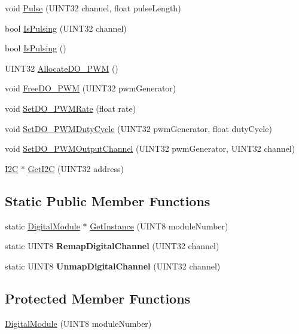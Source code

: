 \begin{DoxyCompactItemize}
\item 
void \hyperlink{classDigitalModule_a3651d475c592ed0330cfb08d1de00bc8}{Pulse} (UINT32 channel, float pulseLength)
\item 
bool \hyperlink{classDigitalModule_affabf884db92ab9290189cff53003480}{IsPulsing} (UINT32 channel)
\item 
bool \hyperlink{classDigitalModule_a16bfc42defa1aab106cfbc6fd722b28f}{IsPulsing} ()
\item 
UINT32 \hyperlink{classDigitalModule_a7289f380a40fa407f9b31f81fb8ed0f3}{AllocateDO\_\-PWM} ()
\item 
void \hyperlink{classDigitalModule_a7e388e508e7de68a06868a127670a9da}{FreeDO\_\-PWM} (UINT32 pwmGenerator)
\item 
void \hyperlink{classDigitalModule_a3419b44d9ab72e95df6c0917e5e7db72}{SetDO\_\-PWMRate} (float rate)
\item 
void \hyperlink{classDigitalModule_a74d6d4ae310213e91891de4b8940b917}{SetDO\_\-PWMDutyCycle} (UINT32 pwmGenerator, float dutyCycle)
\item 
void \hyperlink{classDigitalModule_ac9b8da9267956e905c9083dcfb6b4a8f}{SetDO\_\-PWMOutputChannel} (UINT32 pwmGenerator, UINT32 channel)
\item 
\hyperlink{classI2C}{I2C} $\ast$ \hyperlink{classDigitalModule_ae776c8449cf18b7f90fec0126b3e8373}{GetI2C} (UINT32 address)
\end{DoxyCompactItemize}
\subsection*{Static Public Member Functions}
\begin{DoxyCompactItemize}
\item 
static \hyperlink{classDigitalModule}{DigitalModule} $\ast$ \hyperlink{classDigitalModule_ad6384445078c80a3b77ef4d2e840f930}{GetInstance} (UINT8 moduleNumber)
\item 
\hypertarget{classDigitalModule_a3960491ecc2a2adac1f53d87e9cbcbdf}{
static UINT8 {\bfseries RemapDigitalChannel} (UINT32 channel)}
\label{classDigitalModule_a3960491ecc2a2adac1f53d87e9cbcbdf}

\item 
\hypertarget{classDigitalModule_a273fcd2893fbb23fe9747a8468ef3cff}{
static UINT8 {\bfseries UnmapDigitalChannel} (UINT32 channel)}
\label{classDigitalModule_a273fcd2893fbb23fe9747a8468ef3cff}

\end{DoxyCompactItemize}
\subsection*{Protected Member Functions}
\begin{DoxyCompactItemize}
\item 
\hyperlink{classDigitalModule_ab0794c372d0465bbf5c409c9e46dd0de}{DigitalModule} (UINT8 moduleNumber)
\end{DoxyCompactItemize}
